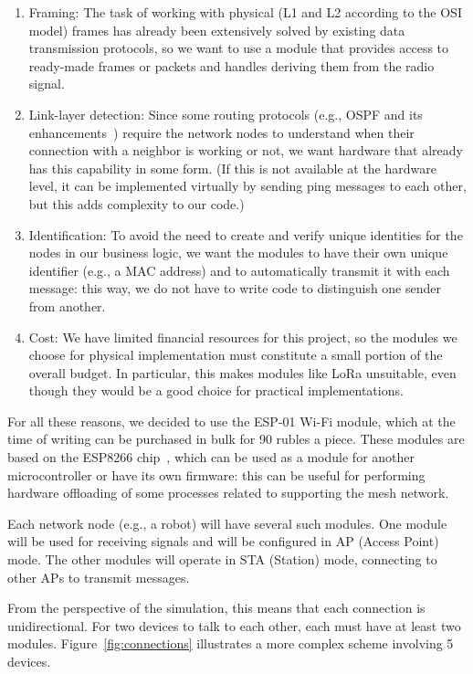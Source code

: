 \documentclass[%
]{article}
\begin{document}
\begin{enumerate}
  \item Framing: The task of working with physical (L1 and L2 according to the OSI model) frames has
  already been extensively solved by existing data transmission protocols,
  so we want to use a module that provides access to ready-made
  frames or packets and handles deriving them from the radio signal.
  
  \item Link-layer detection: Since some routing protocols
  (e.g., OSPF and its enhancements~\cite{rfc5614}) require the network nodes to understand when their
  connection with a neighbor is working or not, we want hardware that already has this capability in some form.
  (If this is not available at the hardware level, it can be implemented virtually by sending ping messages to each other, but this adds complexity to our code.)
  
  \item Identification: To avoid the need to create and verify
  unique identities for the nodes in our business logic,
  we want the modules to have their own unique identifier (e.g., a MAC address)
  and to automatically transmit it with each message: this way, we do not have to write code to distinguish one sender from another.
  
  \item Cost: We have limited financial resources for this project,
  so the modules we choose for physical implementation must constitute
  a small portion of the overall budget. In particular, this makes modules like
  LoRa unsuitable, even though they would be a good choice for practical implementations.
\end{enumerate}

For all these reasons, we decided to use the ESP-01 Wi-Fi module,
which at the time of writing can be purchased in bulk for 90 rubles a piece.
These modules are based on the ESP8266 chip~\cite{esp8266}, which can be used as a
module for another microcontroller or have its own firmware:
this can be useful for performing hardware offloading of some processes related to supporting the mesh network.

Each network node (e.g., a robot) will have several such modules.
One module will be used for receiving signals and will be configured in AP (Access Point) mode.
The other modules will operate in STA (Station) mode, connecting to other APs to transmit messages.

From the perspective of the simulation, this means that each connection is unidirectional.
For two devices to talk to each other, each must have at least two modules.
Figure~\ref{fig:connections} illustrates a more complex scheme involving 5 devices.
\end{document}
